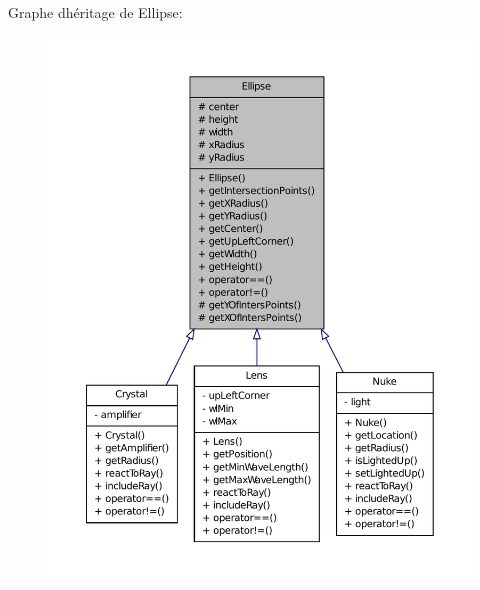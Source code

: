 Graphe d\textquotesingle{}héritage de Ellipse\+:\nopagebreak
\begin{figure}[H]
\begin{center}
\leavevmode
\includegraphics[width=350pt]{dd/d77/classEllipse__inherit__graph}
\end{center}
\end{figure}


